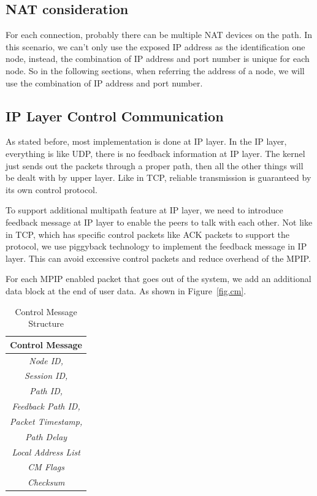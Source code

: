 \subsection{NAT consideration}
For each connection, probably there can be multiple NAT devices on the path. In this scenario, we can\textquoteright t only use the exposed IP address as the identification one node, instead, the combination of IP address and port number is unique for each node. So in the following sections, when referring the address of a node, we will use the combination of IP address and port number.


\subsection{IP Layer Control Communication}
As stated before, most implementation is done at IP layer. In the IP layer, everything is like UDP, there is no feedback information at IP layer. The kernel just sends out the packets through a proper path, then all the other things will be dealt with by upper layer. Like in TCP, reliable transmission is guaranteed by its own control protocol.

To support additional multipath feature at IP layer, we need to introduce feedback message at IP layer to enable the peers to talk with each other. Not like in TCP, which has specific control packets like ACK packets to support the protocol, we use piggyback technology to implement the feedback message in IP layer. This can avoid excessive control packets and reduce overhead of the MPIP.

For each MPIP enabled packet that goes out of the system, we add an additional data block at the end of user data. As shown in Figure~\ref{fig.cm}.


\begin{table}
\caption{\label{tb.cm}Control Message Structure}
\centering
\begin{tabular}{|c|}
\hline
Control Message \\
\hline
\emph{Node ID,} \\
\emph{Session ID,} \\
\emph{Path ID,} \\
\emph{Feedback Path ID,} \\
\emph{Packet Timestamp,} \\
\emph{Path Delay}\\
\emph{Local Address List}\\
\emph{CM Flags}\\
\emph{Checksum}\\
\hline
\end{tabular}
\end{table}

